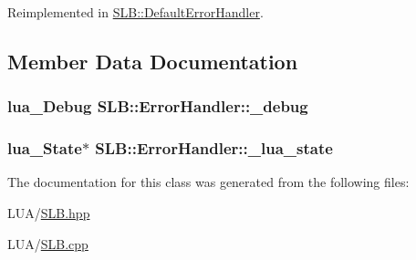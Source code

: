 Reimplemented in \hyperlink{classSLB_1_1DefaultErrorHandler_a5edd0ac3f13251639a912b212e1d51c0}{S\+L\+B\+::\+Default\+Error\+Handler}.



\subsection{Member Data Documentation}
\subsubsection[{\texorpdfstring{\+\_\+debug}{_debug}}]{\setlength{\rightskip}{0pt plus 5cm}lua\+\_\+\+Debug S\+L\+B\+::\+Error\+Handler\+::\+\_\+debug\hspace{0.3cm}{\ttfamily [private]}}\hypertarget{classSLB_1_1ErrorHandler_a3d11337c53985082e82ba2da7e125d45}{}\label{classSLB_1_1ErrorHandler_a3d11337c53985082e82ba2da7e125d45}
\subsubsection[{\texorpdfstring{\+\_\+lua\+\_\+state}{_lua_state}}]{\setlength{\rightskip}{0pt plus 5cm}lua\+\_\+\+State$\ast$ S\+L\+B\+::\+Error\+Handler\+::\+\_\+lua\+\_\+state\hspace{0.3cm}{\ttfamily [private]}}\hypertarget{classSLB_1_1ErrorHandler_ad6be26137f8e4b6094608fdb09095af9}{}\label{classSLB_1_1ErrorHandler_ad6be26137f8e4b6094608fdb09095af9}


The documentation for this class was generated from the following files\+:\begin{DoxyCompactItemize}
\item 
L\+U\+A/\hyperlink{SLB_8hpp}{S\+L\+B.\+hpp}\item 
L\+U\+A/\hyperlink{SLB_8cpp}{S\+L\+B.\+cpp}\end{DoxyCompactItemize}
